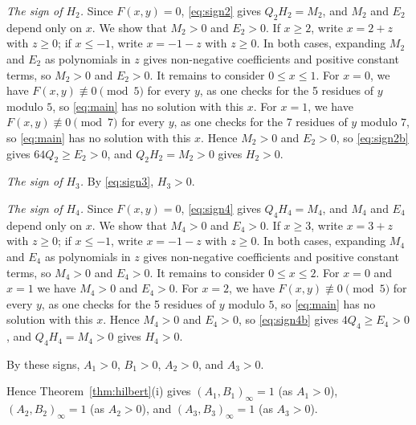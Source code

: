 \documentclass[11pt]{article}
\begin{document}
\emph{The sign of $H_{2}$.} Since $F(x,y)=0$, \eqref{eq:sign2} gives $Q_{2}H_{2}=M_{2}$, and $M_{2}$ and $E_{2}$ depend only on $x$. We show that $M_{2}>0$ and $E_{2}>0$. If $x\geq2$, write $x=2+z$ with $z\geq0$; if $x\leq-1$, write $x=-1-z$ with $z\geq0$. In both cases, expanding $M_{2}$ and $E_{2}$ as polynomials in $z$ gives non-negative coefficients and positive constant terms, so $M_{2}>0$ and $E_{2}>0$. It remains to consider $0\leq x\leq1$. For $x=0$, we have $F(x,y)\not\equiv0\pmod{5}$ for every $y$, as one checks for the 5 residues of $y$ modulo $5$, so \eqref{eq:main} has no solution with this $x$. For $x=1$, we have $F(x,y)\not\equiv0\pmod{7}$ for every $y$, as one checks for the 7 residues of $y$ modulo $7$, so \eqref{eq:main} has no solution with this $x$. Hence $M_{2}>0$ and $E_{2}>0$, so \eqref{eq:sign2b} gives $64Q_{2}\geq E_{2}>0$, and $Q_{2}H_{2}=M_{2}>0$ gives $H_{2}>0$.

\emph{The sign of $H_{3}$.} By \eqref{eq:sign3}, $H_{3}>0$.

\emph{The sign of $H_{4}$.} Since $F(x,y)=0$, \eqref{eq:sign4} gives $Q_{4}H_{4}=M_{4}$, and $M_{4}$ and $E_{4}$ depend only on $x$. We show that $M_{4}>0$ and $E_{4}>0$. If $x\geq3$, write $x=3+z$ with $z\geq0$; if $x\leq-1$, write $x=-1-z$ with $z\geq0$. In both cases, expanding $M_{4}$ and $E_{4}$ as polynomials in $z$ gives non-negative coefficients and positive constant terms, so $M_{4}>0$ and $E_{4}>0$. It remains to consider $0\leq x\leq2$. For $x=0$ and $x=1$ we have $M_{4}>0$ and $E_{4}>0$. For $x=2$, we have $F(x,y)\not\equiv0\pmod{5}$ for every $y$, as one checks for the 5 residues of $y$ modulo $5$, so \eqref{eq:main} has no solution with this $x$. Hence $M_{4}>0$ and $E_{4}>0$, so \eqref{eq:sign4b} gives $4Q_{4}\geq E_{4}>0$, and $Q_{4}H_{4}=M_{4}>0$ gives $H_{4}>0$.

By these signs, $A_{1}>0$, $B_{1}>0$, $A_{2}>0$, and $A_{3}>0$.

Hence Theorem~\ref{thm:hilbert}(i) gives $(A_{1},B_{1})_\infty=1$ (as $A_{1}>0$), $(A_{2},B_{2})_\infty=1$ (as $A_{2}>0$), and $(A_{3},B_{3})_\infty=1$ (as $A_{3}>0$).
\end{document}
